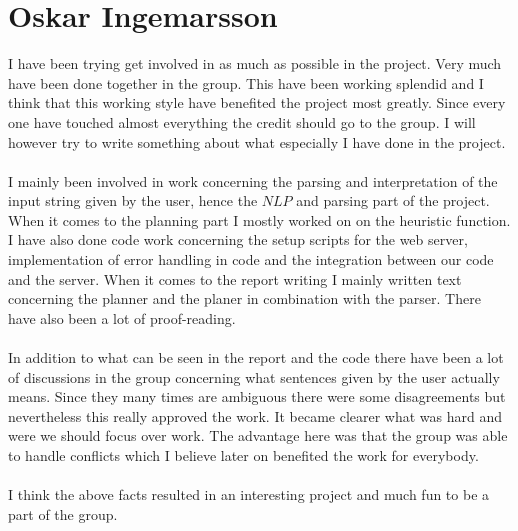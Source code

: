 \section*{Oskar Ingemarsson}
I have been trying get involved in as much as possible in the project.
Very much have been done together in the group. This have been working
splendid and I think that this working style have benefited the project most
greatly. Since every one have touched almost everything the credit should go to
the group. I will however try to write something about what especially I have
done in the project.
\\\\
I mainly been involved in work concerning the parsing and interpretation of the 
input string given by the user, hence the $NLP$ and parsing part of the project.
When it comes to the planning part I mostly worked on on the heuristic function.
I have also done code work concerning the setup scripts for the web server,
implementation of error handling in code and the integration between our code
and the server. When it comes to the report writing I mainly written text
concerning the planner and the planer in combination with the parser. 
There have also been a lot of proof-reading. 
\\\\
In addition to what can be seen in the report and the code there have been a lot
of discussions in the group concerning what sentences given by the user actually
means. Since they many times are ambiguous there were some disagreements but
nevertheless this really approved the work. It became clearer what was hard and
were we should focus over work. The advantage here was that the group was able
to handle conflicts which I believe later on benefited the work for
everybody. 
\\\\
I think the above facts resulted in an interesting project and much fun to be a
part of the group.


